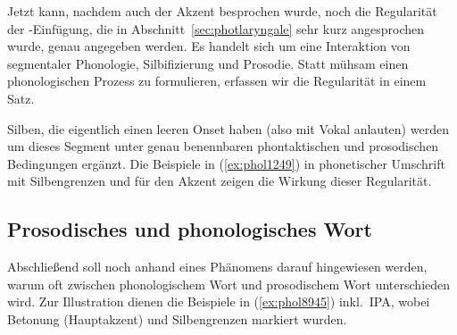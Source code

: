 Jetzt kann, nachdem auch der Akzent besprochen wurde, noch die Regularität der \textipa{[P]}-Einfügung, die in Abschnitt~\ref{sec:photlaryngale} sehr kurz angesprochen wurde, genau angegeben werden.
Es handelt sich um eine Interaktion von segmentaler Phonologie, Silbifizierung und Prosodie.
Statt mühsam einen phonologischen Prozess zu formulieren, erfassen wir die Regularität in einem Satz.


Silben, die eigentlich einen leeren Onset haben (also mit Vokal anlauten) werden um dieses Segment unter genau benennbaren phontaktischen und prosodischen Bedingungen ergänzt.
Die Beispiele in (\ref{ex:phol1249}) in phonetischer Umschrift mit Silbengrenzen und \textipa{[\textprimstress]} für den Akzent zeigen die Wirkung dieser Regularität.

\begin{exe}
  \ex\label{ex:phol1249}
  \begin{xlist}
  \end{xlist}
\end{exe}

\subsection{Prosodisches und phonologisches Wort}

\label{sec:prosphonwort}

Abschließend soll noch anhand eines Phänomens darauf hingewiesen werden, warum oft zwischen phonologischem Wort und prosodischem Wort unterschieden wird.
Zur Illustration dienen die Beispiele in (\ref{ex:phol8945}) inkl.\ IPA, wobei Betonung (Hauptakzent) und Silbengrenzen markiert wurden.

\begin{exe}
  \ex\label{ex:phol8945}
  \begin{xlist}
  \end{xlist}
\end{exe}

